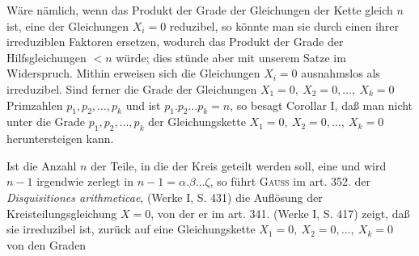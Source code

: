 \par\noindent\hspace*{\parindent}Wäre nämlich, wenn das Produkt der Grade der Gleichungen der Kette gleich \(n\) ist, eine der Gleichungen \(X_i=0\) reduzibel, so könnte man sie durch einen ihrer irreduziblen Faktoren ersetzen, wodurch das Produkt der Grade der Hilfsgleichungen \(<n\) würde; dies stünde aber mit unserem Satze im Widerspruch. Mithin erweisen sich die Gleichungen \(X_i=0\) ausnahmslos als irreduzibel. Sind ferner die Grade der Gleichungen \(X_1=0,\ X_2=0,\ldots,\ X_k=0\) Primzahlen \(p_1,p_2,\ldots,p_k\) und ist \(p_1\mathord{.}p_2\ldots p_k=n\), so besagt Corollar I, daß man nicht unter die Grade \(p_1,p_2,\ldots,p_k\) der Gleichungskette \(X_1=0,\ X_2=0,\ldots,\ X_k=0\) heruntersteigen kann.
\par\noindent\hspace*{\parindent}Ist die Anzahl \(n\) der Teile, in die der Kreis geteilt werden soll, eine  und wird \(n-1\) irgendwie zerlegt in \(n-1=\alpha\mathord{.}\beta\ldots\zeta\), so führt \textsc{Gauss} im art. 352. der \textit{Disquisitiones arithmeticae}, (Werke I, S. 431) die Auflösung der Kreisteilungsgleichung \(X=0\), von der er im art. 341. (Werke I, S. 417) zeigt, daß sie irreduzibel ist, zurück auf eine Gleichungskette \(X_1=0,\ X_2=0,\ldots,\ X_k=0\) von den Graden
\par\endgroup

